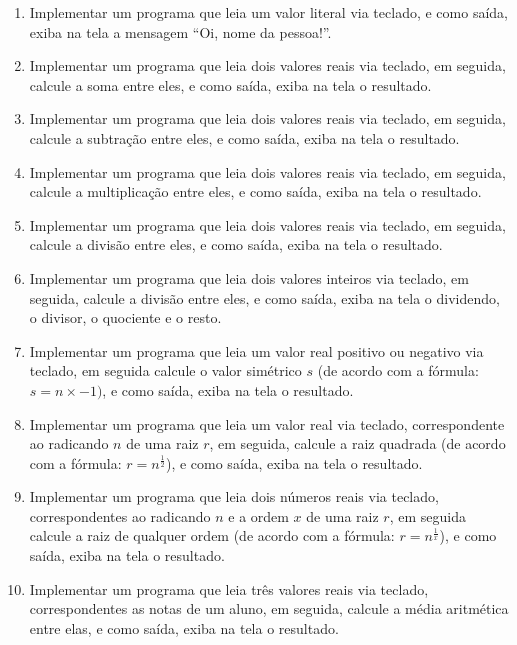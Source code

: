 \documentclass[11pt]{article}
\begin{document}
\begin{enumerate}
	
	\item Implementar um programa que leia um valor literal via teclado, e como saída, exiba na tela a
	mensagem ``Oi, nome da pessoa!''.
	
	\item Implementar um programa que leia dois valores reais via teclado, em seguida, calcule a soma
	entre eles, e como saída, exiba na tela o resultado.
	
	\item  Implementar um programa que leia dois valores reais via teclado, em seguida, calcule a subtração
	entre eles, e como saída, exiba na tela o resultado.
	
	\item Implementar um programa que leia dois valores reais via teclado, em seguida, calcule a
	multiplicação entre eles, e como saída, exiba na tela o resultado.
	
	\item  Implementar um programa que leia dois valores reais via teclado, em seguida, calcule a divisão
	entre eles, e como saída, exiba na tela o resultado.
	
	\item Implementar um programa que leia dois valores inteiros via teclado, em seguida, calcule a divisão
	entre eles, e como saída, exiba na tela o dividendo, o divisor, o quociente e o resto.
	
	\item Implementar um programa que leia um valor real positivo ou negativo via teclado, em seguida
	calcule o valor simétrico $s$ (de acordo com a fórmula: $s = n \times -1)$, e como saída, exiba na tela o
	resultado.
	
	\item Implementar um programa que leia um valor real via teclado, correspondente ao radicando $n$ de
	uma raiz $r$, em seguida, calcule a raiz quadrada (de acordo com a fórmula: $r = n^{\frac{1}{2}}$), e como
	saída, exiba na tela o resultado.
	
	\item  Implementar um programa que leia dois números reais via teclado, correspondentes ao radicando
	$n$ e a ordem $x$ de uma raiz $r$, em seguida calcule a raiz de qualquer ordem (de acordo com a
	fórmula: $r = n^{\frac{1}{x}}$), e como saída, exiba na tela o resultado.
	
	\item Implementar um programa que leia três valores reais via teclado, correspondentes as notas de um
	aluno, em seguida, calcule a média aritmética entre elas, e como saída, exiba na tela o resultado.
	

\end{enumerate}
\end{document}
